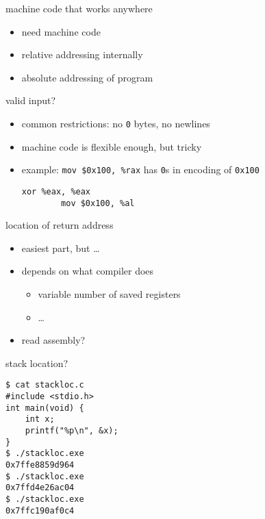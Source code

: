 
\begin{frame}{machine code that works anywhere}
    \begin{itemize}
        \item need  machine code
        \item relative addressing internally
        \item absolute addressing of program
    \end{itemize}
\end{frame}


\begin{frame}[fragile,label=valIn]{valid input?}
    \lstset{language=myasm}
    \begin{itemize}
        \item common restrictions: no {\tt 0} bytes, no newlines
        \item machine code is flexible enough, but tricky
        \item example: \lstinline|mov $0x100, %rax| has {\tt 0}s in encoding of {\tt 0x100}
\begin{lstlisting}[style=small]
        xor %eax, %eax
        mov $0x100, %al
\end{lstlisting}
    \end{itemize}
\end{frame}


\begin{frame}[fragile,label=offsetFromRetAddr]{location of return address}
    \begin{itemize}
        \item easiest part, but \ldots
        \item depends on what compiler does
            \begin{itemize}

                \item variable number of saved registers
                \item \ldots
            \end{itemize}
        \item read assembly?
    \end{itemize}
\end{frame}


\begin{frame}[fragile,label=stackLoc1]{stack location?}
\begin{Verbatim}[fontsize=\fontsize{9}{10}\selectfont]
$ cat stackloc.c
#include <stdio.h>
int main(void) {
    int x;
    printf("%p\n", &x);
}
$ ./stackloc.exe
0x7ffe8859d964
$ ./stackloc.exe
0x7ffd4e26ac04
$ ./stackloc.exe
0x7ffc190af0c4
\end{Verbatim}
\end{frame}

